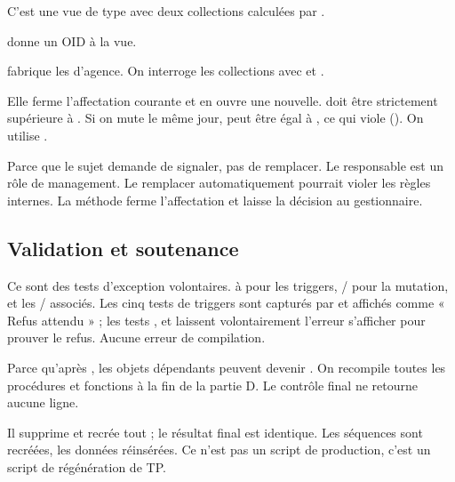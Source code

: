 {C'est une vue de type  avec deux collections calculées
par .}
{ donne un OID à la vue.

 fabrique les  d'agence.
On interroge les collections avec  et
.}

{Elle ferme l'affectation courante et en ouvre une nouvelle. 
doit être strictement supérieure à .}
{Si on mute le même jour,  peut être égal à ,
ce qui viole  (). On utilise
.}

{Parce que le sujet demande de signaler, pas de remplacer.}
{Le responsable est un rôle de management. Le remplacer automatiquement
pourrait violer les règles internes. La méthode ferme l'affectation et laisse
la décision au gestionnaire.}

\subsection{Validation et soutenance}

{Ce sont des tests d'exception volontaires.}
{ à  pour les triggers,
/ pour la mutation, et les
/ associés. Les cinq tests de triggers sont
capturés par  et affichés comme « Refus attendu » ;
les tests ,  et  laissent
volontairement l'erreur s'afficher pour prouver le refus. Aucune erreur de
compilation.}

{Parce qu'après , les objets dépendants peuvent
devenir .}
{On recompile toutes les procédures et fonctions à la fin de la partie D. Le
contrôle final  ne retourne aucune ligne.}

{Il supprime et recrée tout ; le résultat final est identique.}
{Les séquences sont recréées, les données réinsérées. Ce n'est pas un script
de production, c'est un script de régénération de TP.}


